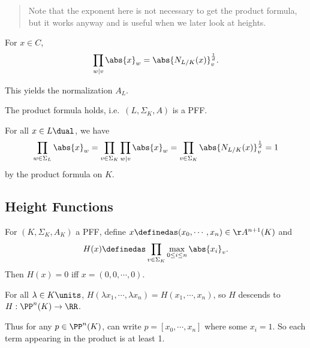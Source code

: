 \begin{quote}
Note that the exponent here is not necessary to get the product formula,
but it works anyway and is useful when we later look at heights.
\end{quote}

\begin{description}
\tightlist
\item[Lemma]
For \(x\in C\),
\begin{align*}
\prod_{w \mid v} \abs{x}_w = \abs{N_{L/K}(x)}_v^{\frac 1 d}
.\end{align*}
\end{description}

This yields the normalization \(A_L\).

\begin{description}
\tightlist
\item[Theorem (Finite Separable Extensions are PFFs)]
The product formula holds, i.e.~\((L, \Sigma_K, A)\) is a PFF.
\end{description}

For all \(x\in L\dual\), we have
\begin{align*}
\prod_{w\in \Sigma_L} \abs{x}_w = \prod_{v\in \Sigma_K} \prod_{w\mid v} \abs{x}_w = \prod_{v\in \Sigma_K} \abs{ N_{L/K}(x)  }_v^{\frac 1 d} = 1
\end{align*} by the product formula on \(K\).

\hypertarget{height-functions-2}{%
\subsection{Height Functions}\label{height-functions-2}}

For \((K, \Sigma_K, A_K)\) a PFF, define
\(x\definedas (x_0, \cdots, x_n) \in \AA^{n+1}(K)\) and
\begin{align*}
H(x) \definedas \prod_{v\in \Sigma_K} \max_{0\leq i \leq n} \abs{x_i}_v
.\end{align*} Then \(H(x) = 0\) iff \(x = (0, 0, \cdots, 0)\).

\begin{description}
\tightlist
\item[Lemma]
For all \(\lambda \in K\units\),
\(H(\lambda x_1, \cdots, \lambda x_n) = H(x_1, \cdots, x_n)\), so \(H\)
descends to \(H: \PP^n(K) \to \RR\).
\end{description}

Thus for any \(p \in \PP^n(K)\), can write \(p = [x_0, \cdots, x_n]\)
where some \(x_i = 1\). So each term appearing in the product is at
least 1.

